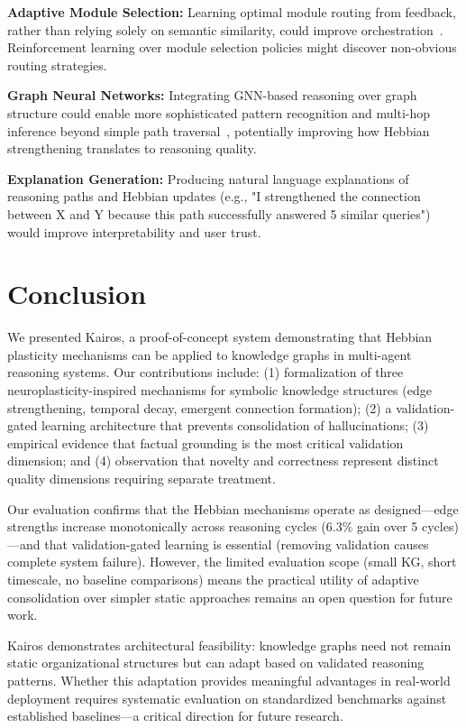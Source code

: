 \documentclass{article}
\begin{document}
\textbf{Adaptive Module Selection:} Learning optimal module routing from feedback, rather than relying solely on semantic similarity, could improve orchestration~\citep{chen2024pog}. Reinforcement learning over module selection policies might discover non-obvious routing strategies.

\textbf{Graph Neural Networks:} Integrating GNN-based reasoning over graph structure could enable more sophisticated pattern recognition and multi-hop inference beyond simple path traversal~\citep{luo2024rog}, potentially improving how Hebbian strengthening translates to reasoning quality.

\textbf{Explanation Generation:} Producing natural language explanations of reasoning paths and Hebbian updates (e.g., "I strengthened the connection between X and Y because this path successfully answered 5 similar queries") would improve interpretability and user trust.

\section{Conclusion}

We presented Kairos, a proof-of-concept system demonstrating that Hebbian plasticity mechanisms can be applied to knowledge graphs in multi-agent reasoning systems. Our contributions include: (1) formalization of three neuroplasticity-inspired mechanisms for symbolic knowledge structures (edge strengthening, temporal decay, emergent connection formation); (2) a validation-gated learning architecture that prevents consolidation of hallucinations; (3) empirical evidence that factual grounding is the most critical validation dimension; and (4) observation that novelty and correctness represent distinct quality dimensions requiring separate treatment.

Our evaluation confirms that the Hebbian mechanisms operate as designed—edge strengths increase monotonically across reasoning cycles (6.3\% gain over 5 cycles)—and that validation-gated learning is essential (removing validation causes complete system failure). However, the limited evaluation scope (small KG, short timescale, no baseline comparisons) means the practical utility of adaptive consolidation over simpler static approaches remains an open question for future work.

Kairos demonstrates architectural feasibility: knowledge graphs need not remain static organizational structures but can adapt based on validated reasoning patterns. Whether this adaptation provides meaningful advantages in real-world deployment requires systematic evaluation on standardized benchmarks against established baselines—a critical direction for future research.
\end{document}
